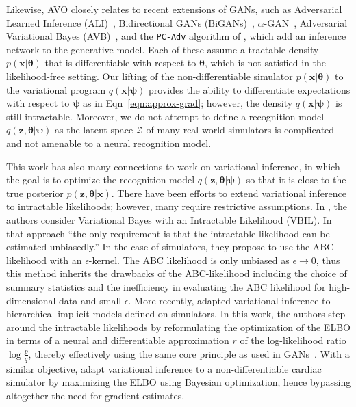 \documentclass{article}
\newcommand{\bftheta}{{\bm \theta}}
\newcommand{\bfpsi}{{\bm \psi}}
\newcommand{\bfx}{\mathbf{x}}
\newcommand{\bfz}{\mathbf{z}}
\theoremstyle{plain}
\begin{document}
Likewise, AVO closely relates to recent extensions of GANs, such as
Adversarial Learned Inference (ALI)~\cite{dumoulin2016adversarially},
Bidirectional GANs (BiGANs)~\cite{donahue2016adversarial},
$\alpha$-GAN~\cite{rosca2017variational}, Adversarial Variational Bayes
(AVB)~\cite{DBLP:journals/corr/MeschederNG17}, and the \texttt{PC-Adv}
algorithm of  \cite{2017arXiv170208235H}, which
add an inference network to the generative model.  Each of these assume a
tractable density $p(\bfx|\bftheta)$ that is differentiable with respect to
$\bftheta$, which is  not satisfied in the likelihood-free setting. Our lifting
of the non-differentiable simulator $p(\bfx|\bftheta)$ to the variational
program $q(\bfx | \bfpsi)$ provides the ability to differentiate expectations
with respect to $\bfpsi$ as in Eqn~\ref{eqn:approx-grad}; however, the density
$q(\bfx | \bfpsi)$ is still intractable. Moreover, we do not attempt to define a
recognition model  $q(\bfz, \bftheta|\bfpsi)$ as the latent space $\mathcal{Z}$
of many real-world simulators is complicated and not amenable to a neural
recognition model.

This work has also many connections to work on variational inference, in which
the goal is to optimize the recognition model $q(\bfz, \bftheta|\bfpsi)$ so that
it is close to the true posterior $p(\bfz, \bftheta |\mathbf{x})$. There have
been efforts to extend variational inference to intractable likelihoods;
however, many require restrictive assumptions.  In \cite{tran2017variational},
the authors consider Variational Bayes with an Intractable Likelihood (VBIL). In
that approach ``the only requirement is that the intractable likelihood can be
estimated unbiasedly.'' In the case of simulators, they propose to use the
ABC-likelihood with an $\epsilon$-kernel. The ABC likelihood is only unbiased as
$\epsilon \to 0$,   thus this method inherits the drawbacks of the
ABC-likelihood including the choice of summary statistics and the inefficiency
in evaluating the ABC likelihood for high-dimensional data and small $\epsilon$.
More recently, \cite{2017arXiv170208896T} adapted variational inference to
hierarchical implicit models defined on simulators. In this work, the authors
step around the intractable likelihoods by reformulating the optimization of the
ELBO in terms of a neural and differentiable approximation $r$ of the log-likelihood
ratio $\log \tfrac{p}{q}$, thereby effectively using the same core principle as used
in GANs~\cite{2016arXiv161003483M}. With a similar objective, \cite{2017arXiv171203353M}
adapt variational inference to a non-differentiable cardiac simulator by maximizing
the ELBO using Bayesian optimization, hence bypassing altogether the need for gradient estimates.
\end{document}
